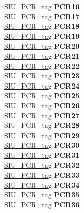 \begin{DoxyCompactItemize}
\begin{tabbing}
\>\>\mbox{\hyperlink{unionSIU__tag_1_1SIU__PCR__tag}{SIU\_PCR\_tag}} {\bfseries PCR16}\\
\>\>\mbox{\hyperlink{unionSIU__tag_1_1SIU__PCR__tag}{SIU\_PCR\_tag}} {\bfseries PCR17}\\
\>\>\mbox{\hyperlink{unionSIU__tag_1_1SIU__PCR__tag}{SIU\_PCR\_tag}} {\bfseries PCR18}\\
\>\>\mbox{\hyperlink{unionSIU__tag_1_1SIU__PCR__tag}{SIU\_PCR\_tag}} {\bfseries PCR19}\\
\>\>\mbox{\hyperlink{unionSIU__tag_1_1SIU__PCR__tag}{SIU\_PCR\_tag}} {\bfseries PCR20}\\
\>\>\mbox{\hyperlink{unionSIU__tag_1_1SIU__PCR__tag}{SIU\_PCR\_tag}} {\bfseries PCR21}\\
\>\>\mbox{\hyperlink{unionSIU__tag_1_1SIU__PCR__tag}{SIU\_PCR\_tag}} {\bfseries PCR22}\\
\>\>\mbox{\hyperlink{unionSIU__tag_1_1SIU__PCR__tag}{SIU\_PCR\_tag}} {\bfseries PCR23}\\
\>\>\mbox{\hyperlink{unionSIU__tag_1_1SIU__PCR__tag}{SIU\_PCR\_tag}} {\bfseries PCR24}\\
\>\>\mbox{\hyperlink{unionSIU__tag_1_1SIU__PCR__tag}{SIU\_PCR\_tag}} {\bfseries PCR25}\\
\>\>\mbox{\hyperlink{unionSIU__tag_1_1SIU__PCR__tag}{SIU\_PCR\_tag}} {\bfseries PCR26}\\
\>\>\mbox{\hyperlink{unionSIU__tag_1_1SIU__PCR__tag}{SIU\_PCR\_tag}} {\bfseries PCR27}\\
\>\>\mbox{\hyperlink{unionSIU__tag_1_1SIU__PCR__tag}{SIU\_PCR\_tag}} {\bfseries PCR28}\\
\>\>\mbox{\hyperlink{unionSIU__tag_1_1SIU__PCR__tag}{SIU\_PCR\_tag}} {\bfseries PCR29}\\
\>\>\mbox{\hyperlink{unionSIU__tag_1_1SIU__PCR__tag}{SIU\_PCR\_tag}} {\bfseries PCR30}\\
\>\>\mbox{\hyperlink{unionSIU__tag_1_1SIU__PCR__tag}{SIU\_PCR\_tag}} {\bfseries PCR31}\\
\>\>\mbox{\hyperlink{unionSIU__tag_1_1SIU__PCR__tag}{SIU\_PCR\_tag}} {\bfseries PCR32}\\
\>\>\mbox{\hyperlink{unionSIU__tag_1_1SIU__PCR__tag}{SIU\_PCR\_tag}} {\bfseries PCR33}\\
\>\>\mbox{\hyperlink{unionSIU__tag_1_1SIU__PCR__tag}{SIU\_PCR\_tag}} {\bfseries PCR34}\\
\>\>\mbox{\hyperlink{unionSIU__tag_1_1SIU__PCR__tag}{SIU\_PCR\_tag}} {\bfseries PCR35}\\
\>\>\mbox{\hyperlink{unionSIU__tag_1_1SIU__PCR__tag}{SIU\_PCR\_tag}} {\bfseries PCR36}\\

\end{tabbing}
\end{DoxyCompactItemize}
